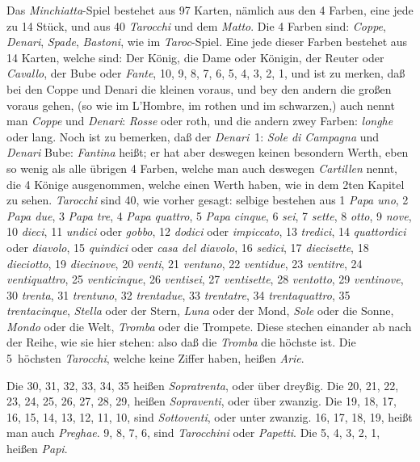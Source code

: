 \documentclass[11pt,a6paper,twoside]{article}
\begin{document}
Das \textit{Minchiatta}-Spiel bestehet aus 97 Karten, nämlich aus den 4 Farben, eine jede zu 14 Stück, und aus 40 \textit{Tarocchi} und dem \textit{Matto}. Die 4 Farben sind: \textit{Coppe}, \textit{Denari}, \textit{Spade}, \textit{Bastoni}, wie im \textit{Taroc}-Spiel. Eine jede dieser Farben bestehet aus 14 Karten, welche sind: Der König, die Dame oder Königin, der Reuter oder \textit{Cavallo}, der Bube oder \textit{Fante}, 10, 9, 8, 7, 6, 5, 4, 3, 2, 1, und ist zu merken, daß bei den Coppe und Denari die kleinen voraus, und bey den andern die großen voraus gehen, (so wie im L'Hombre, im rothen und im schwarzen,) auch nennt man \textit{Coppe} und \textit{Denari}: \mbox{\textit{Rosse}} oder roth, und die andern zwey Farben: \mbox{\textit{longhe}} oder lang. Noch ist zu bemerken, daß der \textit{Denari}~1: \textit{Sole di Campagna} und \textit{Denari} Bube: \textit{Fantina} heißt; er hat aber deswegen keinen besondern Werth, eben so wenig als alle übrigen 4 Farben, welche man auch deswegen \textit{Cartillen} nennt, die 4 Könige ausgenommen, welche einen Werth haben, wie in dem 2ten Kapitel zu sehen. \textit{Tarocchi} sind 40, wie vorher gesagt: selbige bestehen aus
1 \textit{Papa uno}, 2 \textit{Papa due}, 3 \textit{Papa tre}, 4 \textit{Papa quattro}, 5 \textit{Papa cinque}, 6 \textit{sei}, 7 \textit{sette}, 8 \textit{otto}, 9 \textit{nove}, 10 \textit{dieci}, 11 \textit{undici} oder \textit{gobbo}, 12 \textit{dodici} oder \textit{impiccato}, 13 \textit{tredici}, 14 \textit{quattordici} oder \textit{diavolo}, 15 \textit{quindici} oder \textit{casa del diavolo}, 16 \textit{sedici}, 17 \textit{diecisette}, 18 \textit{dieciotto}, 19 \textit{diecinove}, 20 \textit{venti}, 21 \textit{ventuno}, 22 \textit{ventidue}, 23 \textit{ventitre}, 24 \textit{ventiquattro}, 25 \textit{venticinque}, 26 \textit{ventisei}, 27 \textit{ventisette}, 28 \textit{ventotto}, 29 \textit{ventinove}, 30 \textit{trenta}, 31 \textit{trentuno}, 32 \textit{trentadue}, 33 \textit{trentatre}, 34 \textit{trentaquattro}, 35 \textit{trentacinque}, \textit{Stella} oder der Stern, \textit{Luna} oder der Mond, \textit{Sole} oder die Sonne, \textit{Mondo} oder die Welt, \textit{Tromba} oder die Trompete. Diese stechen einander ab nach der Reihe, wie sie hier stehen: also daß die \textit{Tromba} die höchste ist. Die 5~höchsten \textit{Tarocchi}, welche keine Ziffer haben, heißen \textit{Arie}.

Die 30, 31, 32, 33, 34, 35 heißen \textit{Sopratrenta}, oder über dreyßig. Die 20, 21, 22, 23, 24, 25, 26, 27, 28, 29, heißen \textit{Sopraventi}, oder über zwanzig. Die 19, 18, 17, 16, 15, 14, 13, 12, 11, 10, sind \textit{Sottoventi}, oder unter zwanzig. 16, 17, 18, 19, heißt man auch \textit{Preghae}. 9, 8, 7, 6, sind \textit{Tarocchini} oder \textit{Papetti}. Die 5, 4, 3, 2, 1, heißen \textit{Papi}.
\end{document}
